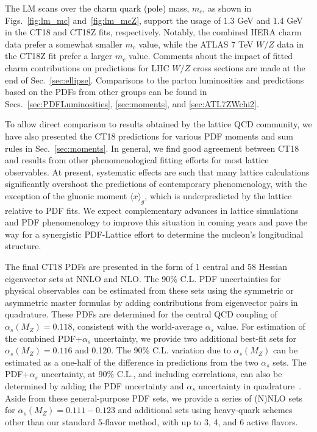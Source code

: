 The LM scans over the charm quark (pole) mass, $m_c$, as shown in Figs.~\ref{fig:lm_mc} and~\ref{fig:lm_mcZ}, support the usage of 1.3 GeV and 1.4 GeV in the CT18 and CT18Z fits,
respectively. Notably, the combined HERA charm data prefer a somewhat smaller $m_c$ value, while the ATLAS 7 TeV $W/Z$ data in the CT18Z fit prefer a larger $m_c$ value. Comments about the impact of fitted charm contributions on predictions for LHC $W/Z$ cross sections are made at the end of Sec.~\ref{sec:ellipse}.
Comparisons to the parton luminosities and predictions based on the PDFs from other groups can be found in Secs.~\ref{sec:PDFLuminosities}, \ref{sec:moments}, and \ref{sec:ATL7ZWchi2}.

To allow direct comparison to results obtained by the lattice QCD community, we have also presented the CT18 predictions for various PDF moments and sum rules in Sec.~\ref{sec:moments}.
In general, we find good agreement between CT18 and results from other phenomenological fitting efforts for most lattice observables.  At present, systematic
effects are such that many lattice calculations significantly overshoot the predictions of contemporary phenomenology, with the exception of the gluonic moment $\langle x \rangle_g$, which
is underpredicted by the lattice relative to PDF fits.  We expect complementary advances in lattice simulations and PDF phenomenology to improve this situation
in coming years and pave the way for a synergistic PDF-Lattice effort \cite{Hobbs:2019gob,Lin:2017snn} to determine the nucleon's longitudinal structure.

The final CT18 PDFs are presented in the form of 1 central and 58
Hessian eigenvector sets at NNLO and NLO. The 90\% C.L. PDF
uncertainties for physical observables can be estimated from these
sets using the symmetric \cite{Pumplin:2002vw} or asymmetric
\cite{Lai:2010vv,Nadolsky:2001yg} master formulas by adding
contributions from eigenvector pairs in quadrature. These PDFs are
determined for the central QCD coupling of $\alpha_s(M_Z)=0.118$,
consistent with the world-average $\alpha_s$ value. For estimation of
the combined PDF+$\alpha_s$ uncertainty, we provide two additional
best-fit sets for $\alpha_s(M_Z)=0.116$ and 0.120. The
90\% C.L. variation due to $\alpha_s(M_Z)$ can be estimated as a one-half of the
difference in predictions from the two $\alpha_s$ sets. The
PDF+$\alpha_s$ uncertainty, at 90\% C.L., and including correlations,
can also be determined by adding the PDF uncertainty and $\alpha_s$
uncertainty in quadrature~\cite{Lai:2010nw}.
Aside from these general-purpose PDF sets, we provide a series of (N)NLO
sets for $\alpha_s(M_Z)=0.111-0.123$
and additional sets using heavy-quark
schemes other than our standard 5-flavor method, with up to 3, 4, and 6 active flavors. 

